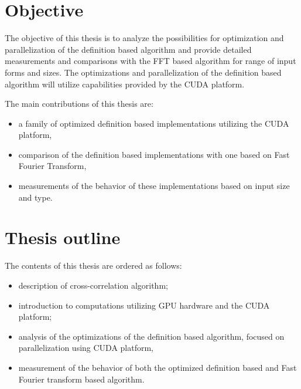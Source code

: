 \section*{Objective}
The objective of this thesis is to analyze the possibilities for optimization and parallelization of the definition based algorithm and provide detailed measurements and comparisons with the FFT based algorithm for range of input forms and sizes. The optimizations and parallelization of the definition based algorithm will utilize capabilities provided by the CUDA platform.

The main contributions of this thesis are:
\begin{itemize}
	\item a family of optimized definition based implementations utilizing the CUDA platform,
	\item comparison of the definition based implementations with one based on Fast Fourier Transform,
	\item measurements of the behavior of these implementations based on input size and type.
\end{itemize}

\section*{Thesis outline}
The contents of this thesis are ordered as follows:
\begin{itemize}
	\item description of cross-correlation algorithm;
	\item introduction to computations utilizing GPU hardware and the CUDA platform;
	\item analysis of the optimizations of the definition based algorithm, focused on parallelization using CUDA platform,
	\item measurement of the behavior of both the optimized definition based and Fast Fourier transform based algorithm.
\end{itemize}


